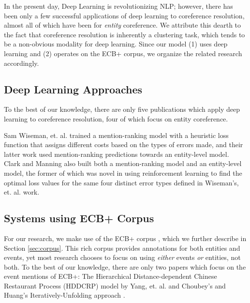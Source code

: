 \documentclass[11pt,a4paper]{article}
\begin{document}
In the present day, Deep Learning is revolutionizing NLP; however, there has been only a few successful applications of deep learning to coreference resolution, almost all of which have been for \textit{entity} coreference.  We attribute this dearth to the fact that coreference resolution is inherently a clustering task, which tends to be a non-obvious modality for deep learning.  Since our model (1) uses deep learning and (2) operates on the ECB+ corpus, we organize the related research accordingly.

\subsection{Deep Learning Approaches}
To the best of our knowledge, there are only five publications which apply deep learning to coreference resolution, four of which focus on entity coreference.

Sam Wiseman, et. al.  trained a mention-ranking model with a heuristic loss function that assigns different costs based on the types of errors made, and their latter work used mention-ranking predictions towards an entity-level model.
Clark and Manning  also built both a mention-ranking model and an entity-level model, the former of which was novel in using reinforcement learning to find the optimal loss values for the same four distinct error types defined in Wiseman's, et. al.  work.

\subsection{Systems using ECB+ Corpus}
For our research, we make use of the ECB+ corpus \cite{ECB+}, which we further describe in Section \ref{sec:corpus}.  This rich corpus provides annotations for both entities and events, yet most research chooses to focus on using \textit{either} events \textit{or} entities, not both.  To the best of our knowledge, there are only two papers which focus on the event mentions of ECB+: The Hierarchical Distance-dependent Chinese Restaurant Process (HDDCRP) model by Yang, et. al.  and Choubey's and Huang's Iteratively-Unfolding approach .
\end{document}
